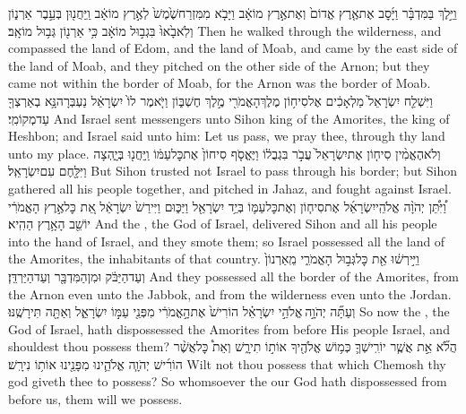 {וַיֵּ֣לֶךְ בַּמִּדְבָּ֗ר וַיָּ֜סׇב אֶת\maqqaf אֶ֤רֶץ אֱדוֹם֙ וְאֶת\maqqaf אֶ֣רֶץ מוֹאָ֔ב וַיָּבֹ֤א מִמִּזְרַח\maqqaf שֶׁ֙מֶשׁ֙ לְאֶ֣רֶץ מוֹאָ֔ב וַֽיַּחֲנ֖וּן בְּעֵ֣בֶר אַרְנ֑וֹן וְלֹֽא\maqqaf בָ֙אוּ֙ בִּגְב֣וּל מוֹאָ֔ב כִּ֥י אַרְנ֖וֹן גְּב֥וּל מוֹאָֽב׃}
{Then he walked through the wilderness, and compassed the land of Edom, and the land of Moab, and came by the east side of the land of Moab, and they pitched on the other side of the Arnon; but they came not within the border of Moab, for the Arnon was the border of Moab.}
{וַיִּשְׁלַ֤ח יִשְׂרָאֵל֙ מַלְאָכִ֔ים אֶל\maqqaf סִיח֥וֹן מֶלֶךְ\maqqaf הָאֱמֹרִ֖י מֶ֣לֶךְ חֶשְׁבּ֑וֹן וַיֹּ֤אמֶר לוֹ֙ יִשְׂרָאֵ֔ל נַעְבְּרָה\maqqaf נָּ֥א בְאַרְצְךָ֖ עַד\maqqaf מְקוֹמִֽי׃}
{And Israel sent messengers unto Sihon king of the Amorites, the king of Heshbon; and Israel said unto him: Let us pass, we pray thee, through thy land unto my place.}
{וְלֹא\maqqaf הֶאֱמִ֨ין סִיח֤וֹן אֶת\maqqaf יִשְׂרָאֵל֙ עֲבֹ֣ר בִּגְבֻל֔וֹ וַיֶּאֱסֹ֤ף סִיחוֹן֙ אֶת\maqqaf כׇּל\maqqaf עַמּ֔וֹ וַֽיַּחֲנ֖וּ בְּיָ֑הְצָה וַיִּלָּ֖חֶם עִם\maqqaf יִשְׂרָאֵֽל׃}
{But Sihon trusted not Israel to pass through his border; but Sihon gathered all his people together, and pitched in Jahaz, and fought against Israel.}
{וַ֠יִּתֵּ֠ן יְהֹוָ֨ה אֱלֹהֵֽי\maqqaf יִשְׂרָאֵ֜ל אֶת\maqqaf סִיח֧וֹן וְאֶת\maqqaf כׇּל\maqqaf עַמּ֛וֹ בְּיַ֥ד יִשְׂרָאֵ֖ל וַיַּכּ֑וּם וַיִּירַשׁ֙ יִשְׂרָאֵ֔ל אֵ֚ת כׇּל\maqqaf אֶ֣רֶץ הָאֱמֹרִ֔י יוֹשֵׁ֖ב הָאָ֥רֶץ הַהִֽיא׃}
{And the \lord, the God of Israel, delivered Sihon and all his people into the hand of Israel, and they smote them; so Israel possessed all the land of the Amorites, the inhabitants of that country.}
{וַיִּ֣ירְשׁ֔וּ אֵ֖ת כׇּל\maqqaf גְּב֣וּל הָאֱמֹרִ֑י מֵֽאַרְנוֹן֙ וְעַד\maqqaf הַיַּבֹּ֔ק וּמִן\maqqaf הַמִּדְבָּ֖ר וְעַד\maqqaf הַיַּרְדֵּֽן׃}
{And they possessed all the border of the Amorites, from the Arnon even unto the Jabbok, and from the wilderness even unto the Jordan.}
{וְעַתָּ֞ה יְהֹוָ֣ה \legarmeh  אֱלֹהֵ֣י יִשְׂרָאֵ֗ל הוֹרִישׁ֙ אֶת\maqqaf הָ֣אֱמֹרִ֔י מִפְּנֵ֖י עַמּ֣וֹ יִשְׂרָאֵ֑ל וְאַתָּ֖ה תִּירָשֶֽׁנּוּ׃}
{So now the \lord, the God of Israel, hath dispossessed the Amorites from before His people Israel, and shouldest thou possess them?}
{הֲלֹ֞א אֵ֣ת אֲשֶׁ֧ר יוֹרִֽישְׁךָ֛ כְּמ֥וֹשׁ אֱלֹהֶ֖יךָ אוֹת֣וֹ תִירָ֑שׁ וְאֵת֩ כׇּל\maqqaf אֲשֶׁ֨ר הוֹרִ֜ישׁ יְהֹוָ֧ה אֱלֹהֵ֛ינוּ מִפָּנֵ֖ינוּ אוֹת֥וֹ נִירָֽשׁ׃}
{Wilt not thou possess that which Chemosh thy god giveth thee to possess? So whomsoever the \lord\space our God hath dispossessed from before us, them will we possess.}
